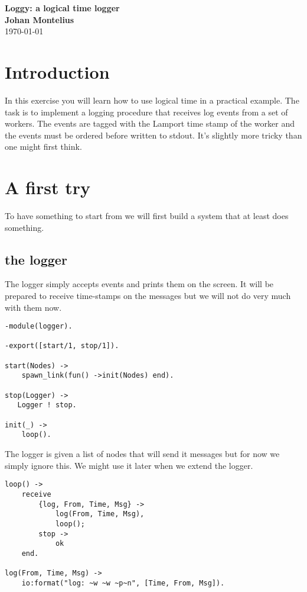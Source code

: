 \documentclass[a4paper, 11pt]{article}
\newcommand{\nnsection}[1]{
\section*{#1}
\addcontentsline{toc}{section}{#1}
}
\begin{document}
\begin{center}
\vspace{20pt}
\textbf{\large Loggy: a logical time logger}\\
\vspace{10pt}
\textbf{Johan Montelius}\\
\vspace{10pt}
\today{}
\end{center}

\nnsection{Introduction}

In this exercise you will learn how to use logical time in a practical
example. The task is to implement a logging procedure that receives
log events from a set of workers. The events are tagged with the
Lamport time stamp of the worker and the events must be ordered before
written to stdout. It's slightly more tricky than one might first think.

\section{A first try}

To have something to start from we will first build a system that at
least does something.

\subsection{the logger}

The logger simply accepts events and prints them on the screen. It
will be prepared to receive time-stamps on the messages but we will
not do very much with them now.

\begin{verbatim}
-module(logger).

-export([start/1, stop/1]).

start(Nodes) ->
    spawn_link(fun() ->init(Nodes) end).

stop(Logger) ->
   Logger ! stop.

init(_) ->
    loop().
\end{verbatim}

The logger is given a list of nodes that will send it messages but for
now we simply ignore this. We might use it later when we extend the
logger.

\begin{verbatim}
loop() ->
    receive
        {log, From, Time, Msg} ->
            log(From, Time, Msg),
            loop();
        stop ->
            ok
    end.

log(From, Time, Msg) ->
    io:format("log: ~w ~w ~p~n", [Time, From, Msg]).
\end{verbatim}
\end{document}
